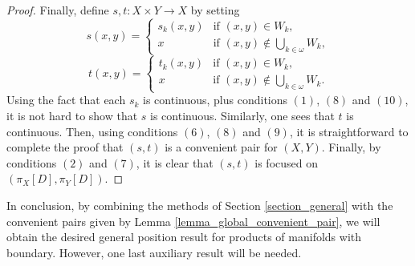\documentclass{amsart}
\theoremstyle{plain}
\theoremstyle{definition}
\begin{document}
\begin{proof}
Finally, define $s,t:X\times Y\longrightarrow X$ by setting
$$
s(x,y)=
\left\{
\begin{array}{ll}
s_k(x,y) & \textrm{if }(x,y)\in W_k,\\
x & \textrm{if }(x,y)\notin\bigcup_{k\in\omega}W_k,
\end{array}
\right.
$$
$$
t(x,y)=
\left\{
\begin{array}{ll}
t_k(x,y) & \textrm{if }(x,y)\in W_k,\\
x & \textrm{if }(x,y)\notin\bigcup_{k\in\omega}W_k.
\end{array}
\right.
$$
Using the fact that each $s_k$ is continuous, plus conditions $(1)$, $(8)$ and $(10)$, it is not hard to show that $s$ is continuous. Similarly, one sees that $t$ is continuous. Then, using conditions $(6)$, $(8)$ and $(9)$, it is straightforward to complete the proof that $(s,t)$ is a convenient pair for $(X,Y)$. Finally, by conditions $(2)$ and $(7)$, it is clear that $(s,t)$ is focused on $(\pi_X[D],\pi_Y[D])$.
\end{proof}

In conclusion, by combining the methods of Section \ref{section_general} with the convenient pairs given by Lemma \ref{lemma_global_convenient_pair}, we will obtain the desired general position result for products of manifolds with boundary. However, one last auxiliary result will be needed.
\end{document}

